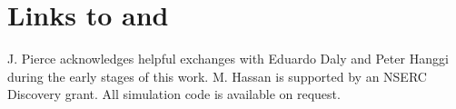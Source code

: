 \documentclass[]{agujournal2018}
\begin{document}
\section{Links to \citet{Einstein1937} and \citet{Lisle1998}}
\acknowledgments
J. Pierce acknowledges helpful exchanges with Eduardo Daly and Peter Hanggi during the early stages of this work. M. Hassan is supported by an NSERC Discovery grant. All simulation code is available on request.


\end{document}
